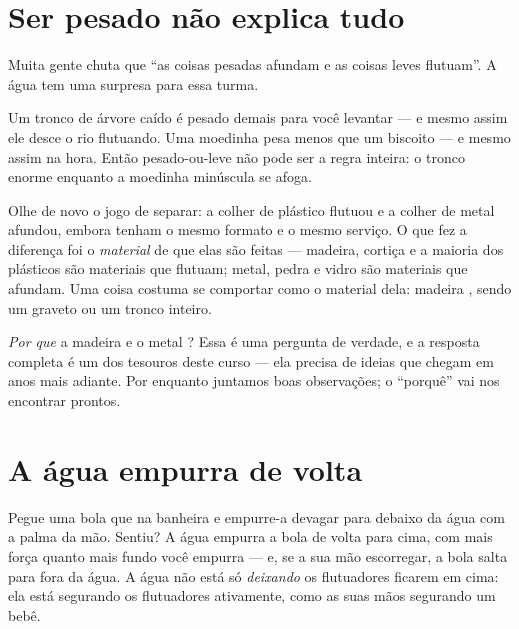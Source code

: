 \section{Ser pesado não explica tudo}

Muita gente chuta que ``as coisas pesadas afundam e as coisas leves
flutuam''. A água tem uma surpresa para essa turma.

\begin{example}\label{ex:g1:floating-and-sinking:log}
Um tronco de árvore caído é pesado demais para você levantar --- e
mesmo assim ele desce o rio flutuando. Uma moedinha pesa menos que um
biscoito --- e mesmo assim  na hora. Então pesado-ou-leve não
pode ser a regra inteira: o tronco enorme  enquanto a moedinha
minúscula se afoga.
\end{example}

\begin{example}\label{ex:g1:floating-and-sinking:stuff}
Olhe de novo o jogo de separar: a colher de plástico flutuou e a
colher de metal afundou, embora tenham o mesmo formato e o mesmo
serviço. O que fez a diferença foi o \emph{material} de que elas são
feitas --- madeira, cortiça e a maioria dos plásticos são materiais
que flutuam; metal, pedra e vidro são materiais que afundam. Uma
coisa costuma se comportar como o material dela: madeira ,
sendo um graveto ou um tronco inteiro.
\end{example}

\begin{remark}\label{rem:g1:floating-and-sinking:why}
\emph{Por que} a madeira  e o metal ? Essa é uma pergunta
de verdade, e a resposta completa é um dos tesouros deste curso ---
ela precisa de ideias que chegam em anos mais adiante. Por enquanto
juntamos boas observações; o ``porquê'' vai nos encontrar prontos.
\end{remark}

\section{A água empurra de volta}

\begin{example}\label{ex:g1:floating-and-sinking:push}
Pegue uma bola que  na banheira e empurre-a devagar para
debaixo da água com a palma da mão. Sentiu? A água empurra a bola de
volta para cima, com mais força quanto mais fundo você empurra --- e,
se a sua mão escorregar, a bola salta para fora da água. A água não
está só \emph{deixando} os flutuadores ficarem em cima: ela está
segurando os flutuadores ativamente, como as suas mãos segurando um
bebê.
\end{example}

